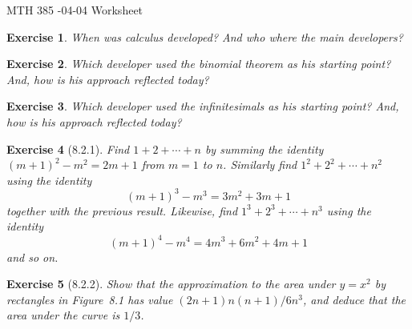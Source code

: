 \documentclass[12pt]{article}
\theoremstyle{plain}
\newtheorem{ex}{Exercise}
\begin{document}
MTH 385 -04-04 Worksheet

\begin{ex}
  When was calculus developed? And who where the main developers?
\end{ex}

\begin{ex} 
  Which developer used the \emph{binomial theorem} as his starting point? And, how is his approach reflected today?
\end{ex}

\begin{ex} 
  Which developer used the \emph{infinitesimals} as his starting point? And, how is his approach reflected today?
\end{ex}

\begin{ex} [8.2.1]
  Find $1+2+\cdots+n$ by summing the identity $(m+1)^2-m^2=2m+1$ from $m=1$ to $n$. Similarly find $1^2+2^2+\cdots+n^2$ using the identity
  \[
    (m+1)^3-m^3=3m^2+3m+1
  \]
  together with the previous result. Likewise, find $1^3+2^3+\cdots+n^3$ using the identity
  \[
    (m+1)^4-m^4=4m^3+6m^2+4m+1
  \]
  and so on.
\end{ex}

\begin{center}

  \caption{Figure~8.1: Approximating an area by rectangles}
\end{center}

\begin{ex} [8.2.2]
  Show that the approximation to the area under $y=x^2$ by rectangles in Figure~8.1 has value $(2n+1)n(n+1)/6n^3$, and deduce that the area under the curve is $1/3$.
\end{ex}
\end{document}
